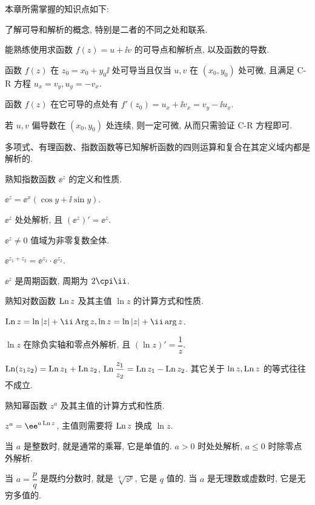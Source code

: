 本章所需掌握的知识点如下:
\begin{conclusion}
  \item 了解可导和解析的概念, 特别是二者的不同之处和联系.
  \item 能熟练使用\thmCR 求函数 $f(z)=u+\ii v$ 的可导点和解析点, 以及函数的导数.
  \begin{conclusion}
    \item 函数 $f(z)$ 在 $z_0=x_0+y_0\ii$ 处可导当且仅当 $u,v$ 在 $(x_0,y_0)$ 处可微, 且满足 C-R 方程 $u_x=v_y, u_y=-v_x$.
    \item 函数 $f(z)$ 在它可导的点处有 $f'(z_0)=u_x+\ii v_x=v_y-\ii u_x$.
    \item 若 $u,v$ 偏导数在 $(x_0,y_0)$ 处连续, 则一定可微, 从而只需验证 C-R 方程即可.
    \item 多项式、有理函数、指数函数等已知解析函数的四则运算和复合在其定义域内都是解析的.
  \end{conclusion}
  \item 熟知指数函数 $\ee^z$ 的定义和性质.
  \begin{conclusion}
    \item $\ee^z=\ee^x(\cos y+\ii\sin y)$.
    \item $\ee^z$ 处处解析, 且 $(\ee^z)'=\ee^z$.
    \item $\ee^z\neq 0$ 值域为非零复数全体.
    \item $\ee^{z_1+z_2}=\ee^{z_1}\cdot \ee^{z_2}$.
    \item $\ee^z$ 是周期函数, 周期为 $2\cpi\ii$.
  \end{conclusion}
  \item 熟知对数函数 $\operatorname{Ln} z$ 及其主值 $\ln z$ 的计算方式和性质.
  \begin{conclusion}
    \item $\Ln z=\ln|z|+\ii\Arg z, \ln z=\ln|z|+\ii\arg z$.
    \item $\ln z$ 在除负实轴和零点外解析, 且 $(\ln z)'=\dfrac1z$.
    \item $\operatorname{Ln}(z_1 z_2)=\operatorname{Ln} z_1+\operatorname{Ln} z_2$, $\operatorname{Ln}\dfrac{z_1}{z_2}=\operatorname{Ln} z_1-\operatorname{Ln} z_2$. 其它关于 $\ln z,\operatorname{Ln} z$ 的等式往往不成立.
  \end{conclusion}
  \item 熟知幂函数 $z^a$ 及其主值的计算方式和性质.
  \begin{conclusion}
    \item $z^a=\ee^{a\Ln z}$, 主值则需要将 $\operatorname{Ln} z$ 换成 $\ln z$.
    \item 当 $a$ 是整数时, 就是通常的乘幂, 它是单值的. $a>0$ 时处处解析, $a\le0$ 时除零点外解析.
    \item 当 $a=\dfrac pq$ 是既约分数时, 就是 $\sqrt[q]{z^p}$, 它是 $q$ 值的. 当 $a$ 是无理数或虚数时, 它是无穷多值的.

\end{conclusion}
\end{conclusion}
